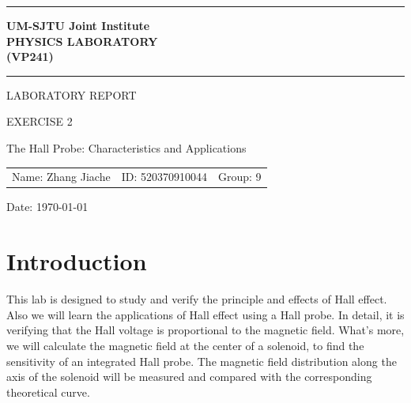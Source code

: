 \documentclass[12pt, a4paper]{article}
\begin{document}
\pagestyle{plain}

\begin{titlepage}

	\begin{center}	

	\vspace{10ex}

	\hrule

	\vspace{2ex}

	\textbf{\Large{UM-SJTU} \Large{J}\large{oint} \Large{I}\large{nstitute} \\
	\Large{P}\large{HYSICS} \Large{L}\large{ABORATORY} \\
	\large{(}\Large{V}\large{P241)}}\\
	
	\vspace{2ex}

	\hrule
	
	\vspace{25ex}
	
	\Large{L}\large{ABORATORY} \Large{R}\large{EPORT}

	\vspace{6ex}

	\large{E}\normalsize{XERCISE 2}

	\vspace{4ex}

	\large The Hall Probe: Characteristics and Applications

	\vspace{4ex}

	\begin{center}
		\begin{tabular}{lll}
		Name: Zhang Jiache & ID: 520370910044 & Group: 9
		\end{tabular}
	\end{center}

	{\large Date: \today}
	
	\end{center}
	
\end{titlepage}

\newpage

\section{Introduction}
This lab is designed to study and verify the principle and effects of Hall effect. Also we will learn the applications of Hall effect 
using a Hall probe. In detail, it is verifying that the Hall voltage is proportional to the magnetic field. What's more, we will calculate 
the magnetic field at the center of a solenoid, to find the sensitivity of an integrated Hall probe. The magnetic field distribution along 
the axis of the solenoid will be measured and compared with the corresponding theoretical curve.
\end{document}
